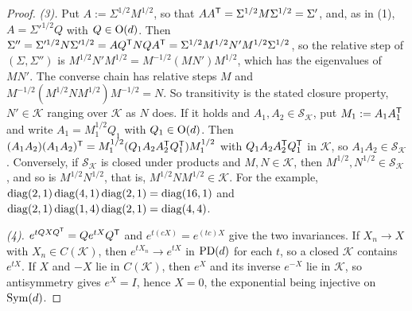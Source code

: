 \begin{proof}
\emph{(3).} Put $A := \Sigma^{1/2}M^{1/2}$, so that $AA^{\mathsf{T}} = \Sigma^{1/2}M\Sigma^{1/2} = \Sigma'$,
and, as in (1), $A = \Sigma'^{1/2}Q$ with $Q \in \mathrm{O}(d)$. Then $\Sigma'' = \Sigma'^{1/2}N\Sigma'^{1/2}
= AQ^{\mathsf{T}}NQA^{\mathsf{T}} = \Sigma^{1/2}M^{1/2}N'M^{1/2}\Sigma^{1/2}$, so the relative step of
$(\Sigma, \Sigma'')$ is $M^{1/2}N'M^{1/2} = M^{-1/2}(MN')M^{1/2}$, which has the eigenvalues of $MN'$.
The converse chain has relative steps $M$ and $M^{-1/2}(M^{1/2}NM^{1/2})M^{-1/2} = N$. So transitivity
is the stated closure property, $N' \in \mathcal K$ ranging over $\mathcal K$ as $N$ does. If it holds
and $A_1, A_2 \in \mathcal S_{\mathcal K}$, put $M_1 := A_1A_1^{\mathsf{T}}$ and write $A_1 = M_1^{1/2}Q_1$ with
$Q_1 \in \mathrm{O}(d)$. Then $(A_1A_2)(A_1A_2)^{\mathsf{T}} = M_1^{1/2}(Q_1A_2A_2^{\mathsf{T}}Q_1^{\mathsf{T}})M_1^{1/2}$ with
$Q_1A_2A_2^{\mathsf{T}}Q_1^{\mathsf{T}}$ in $\mathcal K$, so $A_1A_2 \in \mathcal S_{\mathcal K}$. Conversely, if $\mathcal S_{\mathcal K}$ is closed under
products and $M, N \in \mathcal K$, then $M^{1/2}, N^{1/2} \in \mathcal S_{\mathcal K}$, and so is
$M^{1/2}N^{1/2}$, that is, $M^{1/2}NM^{1/2} \in \mathcal K$. For the example,
$\operatorname{diag}(2,1)\operatorname{diag}(4,1)\operatorname{diag}(2,1) = \operatorname{diag}(16,1)$ and $\operatorname{diag}(2,1)\operatorname{diag}(1,4)\operatorname{diag}(2,1) = \operatorname{diag}(4,4)$.

\emph{(4).} $e^{tQXQ^{\mathsf{T}}} = Qe^{tX}Q^{\mathsf{T}}$ and $e^{t(cX)} = e^{(tc)X}$ give the two invariances. If
$X_n \to X$ with $X_n \in C(\mathcal K)$, then $e^{tX_n} \to e^{tX}$ in $\mathrm{PD}(d)$ for each $t$, so a closed
$\mathcal K$ contains $e^{tX}$. If $X$ and $-X$ lie in $C(\mathcal K)$, then $e^X$ and its inverse
$e^{-X}$ lie in $\mathcal K$, so antisymmetry gives $e^X = I$, hence $X = 0$, the exponential being
injective on $\mathrm{Sym}(d)$.
\end{proof}


